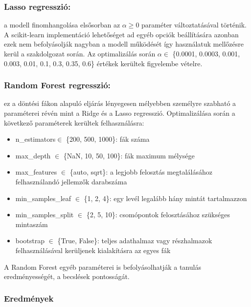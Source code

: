 \subsubsection{Lasso regresszió:} a modell finomhangolása elsősorban az $\alpha \geq 0$ paraméter változtatásával történik. A scikit-learn implementáció lehetőséget ad egyéb opciók beállítására azonban ezek nem befolyásolják nagyban a modell működését így használatuk mellőzésre kerül a szakdolgozat során. Az optimalizálás során $\alpha \in$ \{0.0001, 0.0003, 0.001, 0.003, 0.01, 0.1, 0.3, 0.35, 0.6\} értékek kerültek figyelembe vételre.


\subsubsection{Random Forest regresszió:} ez a döntési fákon alapuló eljárás lényegesen mélyebben személyre szabható a paraméterei révén mint a Ridge és a Lasso regresszió. Optimalizálása során a következő paraméterek kerültek felhasználásra:
\begin{itemize}
	\item n\_estimators$\in$ \{200, 500, 1000\}: fák száma
	\item max\_depth $\in$ \{NaN, 10, 50, 100\}: fák maximum mélysége
	\item max\_features $\in$ \{auto, sqrt\}: a legjobb felosztás megtalálásához felhasználandó jellemzők darabszáma
	\item min\_samples\_leaf $\in$ \{1, 2, 4\}: egy levél legalább hány mintát tartalmazzon
	\item min\_samples\_split $\in$ \{2, 5, 10\}: csomópontok felosztásához szükséges mintaszám
	\item bootstrap $\in$ \{True, False\}: teljes adathalmaz vagy részhalmazok felhasználásával kerüljenek kialakításra az egyes fák
\end{itemize}
A Random Forest egyéb paraméterei is befolyásolhatják a tanulás eredményességét, a becslések pontosságát. 


\subsubsection{Eredmények}

